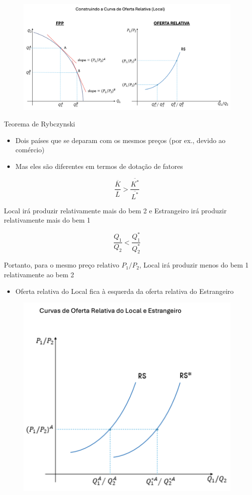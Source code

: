 \documentclass[a4paper,12pt]{article}[abntex2]
\begin{document}
\begin{figure}[H]
    \centering
    \includegraphics[width=0.7\linewidth]{Imagens/a12i7.png}
\end{figure}

Teorema de Rybczynski
\begin{itemize}
    \item Dois países que se deparam com os mesmos preços (por ex., devido ao comércio)
    \item Mas eles são diferentes em termos de dotação de fatores
\end{itemize}

\[
\frac{\overline{K}}{\overline{L}} > \frac{\overline{K^*}}{\overline{L^*}}
\]

Local irá produzir relativamente mais do bem 2 e Estrangeiro irá produzir relativamente mais do bem 1

\[
\frac{Q_1}{Q_2} < \frac{Q_1^*}{Q_2^*}
\]

Portanto, para o mesmo preço relativo \( P_1 / P_2 \), Local irá produzir menos do bem 1 relativamente ao bem 2
\begin{itemize}
    \item Oferta relativa do Local fica à esquerda da oferta relativa do Estrangeiro
\end{itemize}

\begin{figure}[H]
    \centering
    \includegraphics[width=0.7\linewidth]{Imagens/a12i8.png}
\end{figure}
\end{document}
